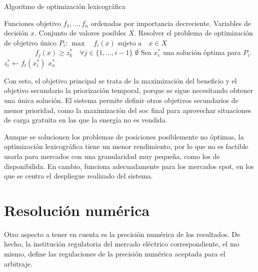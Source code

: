 \begin{algorithm}
  \caption{Algoritmo de optimización lexicográfica}
  \label{alg:optimizacion-lexicografica}
  \begin{algorithmic}
    \Require Funciones objetivo \( f_{1}, \dots, f_{n} \) ordenadas por importancia decreciente.
    \Require Variables de decisión \( x \).
    \Require Conjunto de valores posibles \( X \).
    \State Resolver el problema de optimización de objetivo único \( P_{i} \):
    \Statex \hspace{\algorithmicindent} \( \max \quad f_{i}(x) \)
    \Statex \hspace{\algorithmicindent} \( \text{sujeto a} \quad x \in X \)
    \Statex \hspace{\algorithmicindent} \( \phantom{\text{sujeto a} \quad} f_{j}(x) \geq z_k^* \quad \forall j \in \{1, \dots, i - 1\} \)
    \State \Return \( \emptyset \)
    \EndIf
    \State Sea \( x^{*}_{i} \) una solución óptima para \( P_{i} \).
    \State \( z^{*}_{i} \gets f_t(x^{*}_{i}) \) 
    \EndFor
    \State \Return \( x^{*}_{n} \)
  \end{algorithmic}
\end{algorithm}

Con esto, el objetivo principal se trata de la maximización del beneficio y el objetivo secundario la priorización temporal, porque se sigue necesitando obtener una única solución. El sistema permite definir otros objetivos secundarios de menor prioridad, como la maximización del \gls{soc} final para aprovechar situaciones de carga gratuita en las que la energía no es vendida.

Aunque se solucionen los problemas de posiciones posiblemente no óptimas, la optimización lexicográfica tiene un menor rendimiento, por lo que no es factible usarla para mercados con una granularidad muy pequeña, como los de disponibilida. En cambio, funciona adecuadamente para los mercados spot, en los que se centra el despliegue realizado del sistema.

\section{Resolución numérica}
\label{makereference5.4}

Otro aspecto a tener en cuenta es la precisión numérica de los resultados. De hecho, la institución regulatoria del mercado eléctrico correspondiente, el \gls{mo} mismo, define las regulaciones de la precisión numérica aceptada para el arbitraje.

